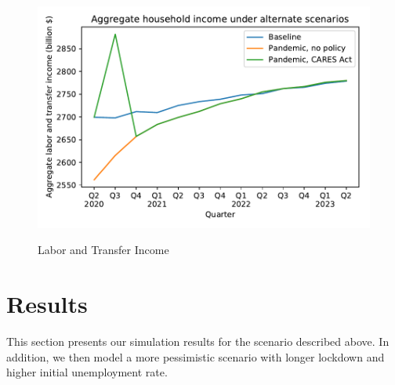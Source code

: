 \documentclass[titlepage]{\econtex}
\begin{document}
\begin{figure}
  \centering
  \caption{Labor and Transfer Income}
  \label{labor_income}
  { \includegraphics[width=8in]{./Figures/AggLT}}
\end{figure}


\section{Results}

This section presents our simulation results for the scenario described above. In addition, we then model a more pessimistic scenario with longer lockdown and higher initial unemployment rate.
\end{document}
